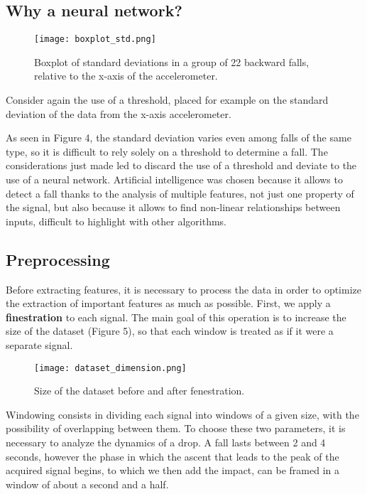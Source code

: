 \documentclass[12pt]{article}
\begin{document}
\subsection*{Why a neural network?}
\begin{wrapfigure}{r}{0.45\textwidth}
\texttt{[image: boxplot\_std.png]} 
\caption{Boxplot of standard deviations in a group of 22 backward falls, relative to the x-axis of the accelerometer.}
\label{fig:wrapfig}
\end{wrapfigure}
Consider again the use of a threshold, placed for example on the standard deviation of the data from the x-axis accelerometer. 

As seen in Figure 4, the standard deviation varies even among falls of the same type, so it is difficult to rely solely on a threshold to determine a fall.
The considerations just made led to discard the use of a threshold and deviate to the use of a neural network. Artificial intelligence was chosen because it allows to detect a fall thanks to the analysis of multiple features, not just one property of the signal, but also because it allows to find non-linear relationships between inputs, difficult to highlight with other algorithms.

\subsection*{Preprocessing}

Before extracting features, it is necessary to process the data in order to optimize the extraction of important features as much as possible.
First, we apply a \textbf{finestration} to each signal. 
The main goal of this operation is to increase the size of the dataset (Figure 5), so that each window is treated as if it were a separate signal.
\begin{wrapfigure}{l}{0.40\textwidth}
\texttt{[image: dataset\_dimension.png]} 
\caption{Size of the dataset before and after fenestration.}
\label{fig:wrapfig}
\end{wrapfigure}
Windowing consists in dividing each signal into windows of a given size, with the possibility of overlapping between them. To choose these two parameters, it is necessary to analyze the dynamics of a drop. A fall lasts between 2 and 4 seconds, however the phase in which the ascent that leads to the peak of the acquired signal begins, to which we then add the impact, can be framed in a window of about a second and a half.
\end{document}
